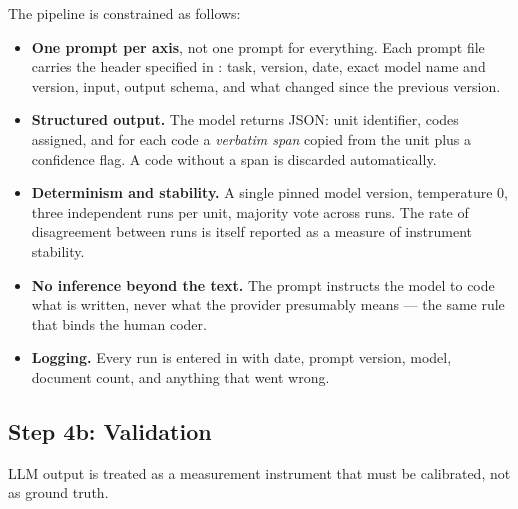 The pipeline is constrained as follows:

\begin{itemize}[leftmargin=*,itemsep=2pt]
  \item \textbf{One prompt per axis}, not one prompt for everything. Each prompt
        file carries the header specified in
        : task, version, date, exact model
        name and version, input, output schema, and what changed since the
        previous version.
  \item \textbf{Structured output.} The model returns JSON: unit identifier,
        codes assigned, and for each code a \emph{verbatim span} copied from the
        unit plus a confidence flag. A code without a span is discarded
        automatically.
  \item \textbf{Determinism and stability.} A single pinned model version,
        temperature 0, three independent runs per unit, majority vote across
        runs. The rate of disagreement between runs is itself reported as a
        measure of instrument stability.
  \item \textbf{No inference beyond the text.} The prompt instructs the model to
        code what is written, never what the provider presumably means --- the
        same rule that binds the human coder.
  \item \textbf{Logging.} Every run is entered in
         with date, prompt version, model,
        document count, and anything that went wrong.
\end{itemize}

\subsection{Step 4b: Validation}
\label{sec:validation}

LLM output is treated as a measurement instrument that must be calibrated, not
as ground truth.

